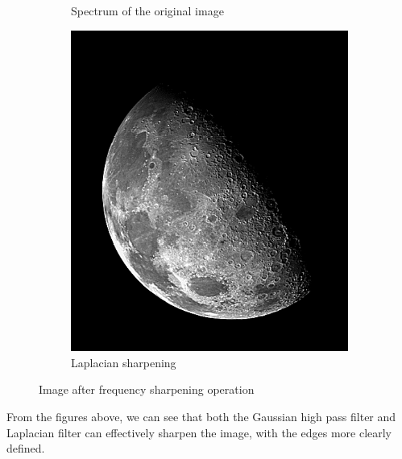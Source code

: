 \documentclass[UTF8]{ctexart}
\begin{document}
\begin{figure}[htbp]
\begin{subfigure}{0.3\textwidth}
        \caption{Spectrum of the original image}
    \end{subfigure}%
    \hfill
    \begin{subfigure}{0.3\textwidth}
        \centering
        \includegraphics[width=\linewidth]{blurry_moon_lap.png}
        \caption{Laplacian sharpening}
    \end{subfigure}
    \caption{Image after frequency sharpening operation}
\end{figure}

From the figures above, we can see that both the Gaussian high pass filter and Laplacian filter can effectively sharpen the image, 
with the edges more clearly defined.\\
\end{document}
